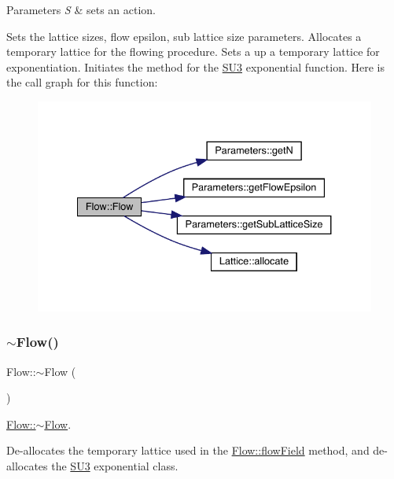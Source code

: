 \begin{DoxyParams}{Parameters}
{\em S} & sets an action.\\
\hline
\end{DoxyParams}
Sets the lattice sizes, flow epsilon, sub lattice size parameters. Allocates a temporary lattice for the flowing procedure. Sets a up a temporary lattice for exponentiation. Initiates the method for the \mbox{\hyperlink{class_s_u3}{S\+U3}} exponential function. Here is the call graph for this function\+:
\nopagebreak
\begin{figure}[H]
\begin{center}
\leavevmode
\includegraphics[width=334pt]{class_flow_a25ae85599c0ae330374f0840efde7ebc_cgraph}
\end{center}
\end{figure}
\mbox{\label{class_flow_a5991efa6e8cf88c4ef2125cc727db333}} 
\subsubsection{\texorpdfstring{$\sim$Flow()}{~Flow()}}
{\footnotesize\ttfamily Flow\+::$\sim$\+Flow (\begin{DoxyParamCaption}{ }\end{DoxyParamCaption})}



\mbox{\hyperlink{class_flow_a5991efa6e8cf88c4ef2125cc727db333}{Flow\+::$\sim$\+Flow}}. 

De-\/allocates the temporary lattice used in the \mbox{\hyperlink{class_flow_a284b490ddedc9cf5d0f2ab0660c328f6}{Flow\+::flow\+Field}} method, and de-\/allocates the \mbox{\hyperlink{class_s_u3}{S\+U3}} exponential class. 

